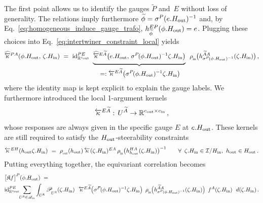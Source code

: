 The first point allows us to identify the gauges $\widetilde{P}$ and~$E$ without loss of generality.
The relations imply furthermore $\widetilde{\phi} = \sigma^P (e.H_{\textup{out}})^{-1}$ and, by Eq.~\eqref{eq:homogeneous_induce_gauge_trafo}, $h_{\widetilde{\phi}}^{EP} (\phi.H_{\textup{out}}) = e$.
Plugging these choices into Eq.~\eqref{eq:intertwiner_constraint_local} yields
\begin{align}
    \widehat{\overleftarrow{\kappa}} \rule{0pt}{0pt}^{\mkern-1mu PA}(\phi.\Hout,\, \zeta.\Hin)
    \ =\ 
    \id_{\R^\cout}^{PE}\ 
    \underbrace{ \vphantom{\Big(}
    \widehat{\overleftarrow{\kappa}} \rule{0pt}{0pt}^{\mkern-1mu E\widetilde{A}}\big( e.\Hout,\, \sigma^P \mkern-2mu (\phi.\Hout)^{-1} \zeta.\Hin\big)}_{ \rule{0pt}{14pt} \displaystyle
    =: \overleftarrow{\kappa}^{E\widetilde{A}} \big( \sigma^P \mkern-2mu (\phi.\Hout)^{-1} \zeta.\Hin \big) }
    \,\ \rhoin\big( h_{\sigma^P \mkern-2mu (\phi.\Hout)^{-1}}^{\widetilde{A}A} (\zeta.\Hin) \big) \,,
\end{align}
where the identity map is kept explicit to explain the gauge labels.
We furthermore introduced the local 1-argument kernels
\begin{align}\label{eq:local_one_arg_kernel}
    \overleftarrow{\kappa}^{E\widetilde{A}} :\, U^{\widetilde{A}} \to \mathbb{R}^{{c_\textup{out}}\times{c_\textup{in}}} \,,
\end{align}
whose responses are always given in the specific gauge $E$ at $e.H_{\textup{out}}$.
These kernels are still required to satisfy the $H_{\textup{out}}$-steerability constraints
\begin{align}\label{eq:single_steerability}
    \overleftarrow{\kappa}^{EH} (h_\textup{out} \zeta.\Hin)
    \ =\ \rhoout(h_\textup{out})\, \overleftarrow{\kappa} (\zeta.\Hin)^{EA} \,
    \rhoin\big( h_{h_\textup{out}}^{HA} (\zeta.\Hin) \big)^{-1}
    \qquad \forall\,\ \zeta.\Hin\in \I/\Hin,\ h_\textup{out}\in\Hout \,.
\end{align}
Putting everything together, the equivariant correlation becomes
\begin{align}
    & \big[ \mathfrak{K} f \big]^P (\phi.\Hout) \ = \\
    & \id_{\R^\cout}^{PE} \mkern-6mu
    \sum_{U^{\!A} \in \mathscr{A}_\textup{in}} \int_{U^{\!A}} \mathscr{P}_{\!\overset{}{U^{\!A}}} (\zeta.\Hin)\ \ 
        \overleftarrow{\kappa} \rule{0pt}{0pt}^{\mkern-1mu E\widetilde{A}} \pig( \sigma^P \mkern-2mu (\phi.\Hout)^{-1} \zeta.\Hin \pig)\,\ 
        \rhoin\pig( h_{\sigma^P \mkern-2mu (\phi.\Hout)^{-1}}^{\widetilde{A}A} (\zeta.\Hin) \pig)\,\ 
        f^A (\zeta.\Hin)\ \ d(\zeta.\Hin) \,. \notag
\end{align}
